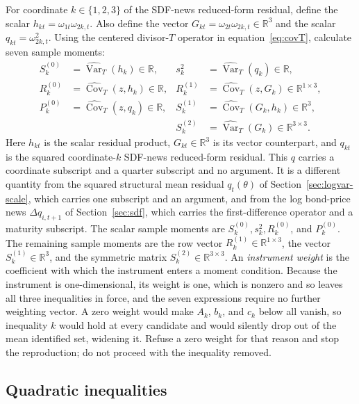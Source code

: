 \documentclass[11pt]{article}
\begin{document}
For coordinate \(k\in\{1,2,3\}\) of the SDF-news reduced-form residual, define the scalar
\(h_{kt}=\omega_{1t}\omega_{2k,t}\). Also define the vector
\(G_{kt}=\omega_{2t}\omega_{2k,t}\in\mathbb R^3\) and the scalar \(q_{kt}=\omega_{2k,t}^2\). Using the centered
divisor-\(T\) operator in equation~\eqref{eq:covT}, calculate seven sample moments:
\begin{align*}
 S_k^{(0)}&=\widehat{\operatorname{Var}}_T(h_k)\in\mathbb R,
 &s_k^2&=\widehat{\operatorname{Var}}_T(q_k)\in\mathbb R,\\
 R_k^{(0)}&=\widehat{\operatorname{Cov}}_T(z,h_k)\in\mathbb R,
 &R_k^{(1)}&=\widehat{\operatorname{Cov}}_T(z,G_k)\in\mathbb R^{1\times3},\\
 P_k^{(0)}&=\widehat{\operatorname{Cov}}_T(z,q_k)\in\mathbb R,
 &S_k^{(1)}&=\widehat{\operatorname{Cov}}_T(G_k,h_k)\in\mathbb R^3,\\
 &&S_k^{(2)}&=\widehat{\operatorname{Var}}_T(G_k)\in\mathbb R^{3\times3}.
\end{align*}
Here \(h_{kt}\) is the scalar residual product, \(G_{kt}\in\mathbb R^3\) is its vector counterpart,
and \(q_{kt}\) is the squared coordinate-\(k\) SDF-news reduced-form residual. This \(q\) carries a
coordinate subscript and a quarter subscript and no argument. It is a different quantity from the
squared structural mean residual \(q_t(\theta)\) of Section~\ref{sec:logvar-scale}, which carries one
subscript and an argument, and from the log bond-price news \(\Delta q_{i,t+1}\) of
Section~\ref{sec:sdf}, which carries the first-difference operator and a maturity
subscript. The scalar sample
moments are \(S_k^{(0)},s_k^2,R_k^{(0)}\), and \(P_k^{(0)}\). The remaining sample moments are the
row vector \(R_k^{(1)}\in\mathbb R^{1\times3}\), the vector
\(S_k^{(1)}\in\mathbb R^3\), and the symmetric matrix
\(S_k^{(2)}\in\mathbb R^{3\times3}\). An \emph{instrument weight} is the coefficient with which the
instrument enters a moment condition. Because the instrument is one-dimensional, its weight is one,
which is nonzero and so leaves all three inequalities in force, and the seven expressions require no
further weighting vector. A zero weight would make \(A_k\), \(b_k\), and \(c_k\) below all vanish, so
inequality \(k\) would hold at every candidate and would silently drop out of the mean identified
set, widening it. Refuse a zero weight for that reason and stop the reproduction; do not proceed
with the inequality removed.

\subsection{Quadratic inequalities}
\end{document}
